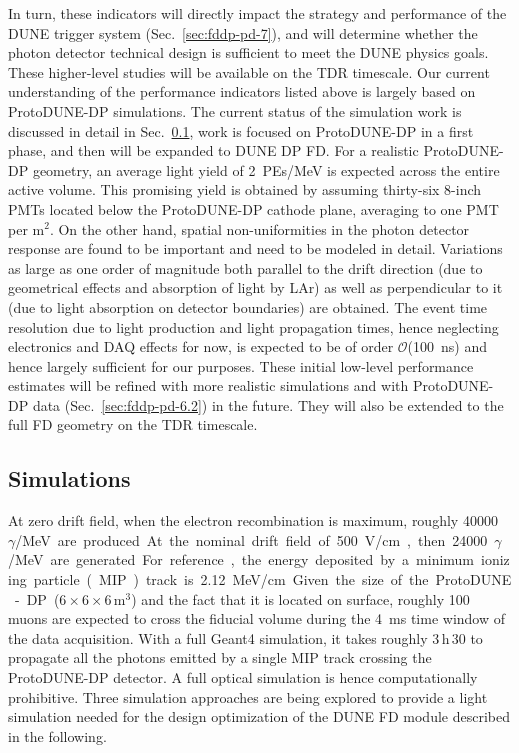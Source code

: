 In turn, these indicators will directly impact the strategy and performance of the DUNE trigger system (Sec.~\ref{sec:fddp-pd-7}), and will determine whether the photon detector technical design is sufficient to meet the DUNE physics goals. These higher-level studies will be available on the TDR timescale. Our current understanding of the performance indicators listed above is largely based on ProtoDUNE-DP simulations. The current status of the simulation work is discussed in detail in Sec.~\ref{sec:fddp-pd-6.1}, work is focused on ProtoDUNE-DP in a first phase, and then will be expanded to DUNE DP FD. For a realistic ProtoDUNE-DP geometry, an average light yield of \SI{2}{PEs/MeV} is expected across the entire active volume. This promising yield is obtained  by assuming thirty-six 8-inch PMTs located below the ProtoDUNE-DP cathode plane, averaging to one PMT per m$^2$. On the other hand, spatial non-uniformities in the photon detector response are found to be important and need to be modeled in detail. Variations as large as one order of magnitude both parallel to the drift direction (due to geometrical effects and absorption of light by LAr) as well as perpendicular to it (due to light absorption on detector boundaries) are obtained. The event time resolution due to light production and light propagation times, hence neglecting electronics and DAQ effects for now, is expected to be of order $\mathcal{O}$(\SI{100}{ns}) and hence largely sufficient for our purposes. These initial low-level performance estimates will be refined with more realistic simulations and with ProtoDUNE-DP data (Sec.~\ref{sec:fddp-pd-6.2}) in the future. They will also be extended to the full FD geometry on the TDR timescale.

\subsection{Simulations}
\label{sec:fddp-pd-6.1}

At zero drift field, when the electron recombination is maximum, roughly \SI{40000}{$\gamma$/MeV} are produced. At the nominal drift field of \SI{500}{V/cm}, then \num{24000}{$\gamma$/MeV} are generated. For reference, the energy deposited by a minimum ionizing particle (MIP) track is \SI{2.12}{MeV/cm}. Given the size of the ProtoDUNE-DP ($6\times6\times6$\,m$^3$) and the fact that it is located on surface, roughly \num{100} muons are expected to cross the fiducial volume during the \SI{4}{ms} time window of the data acquisition. With a full Geant4 \cite{geant4} simulation, it takes roughly 3\,h\,30 to propagate all the photons emitted by a single MIP track crossing the ProtoDUNE-DP detector. A full optical simulation is hence computationally prohibitive. Three simulation approaches are being explored to provide a light simulation needed for the design optimization of the DUNE FD module described in the following.



